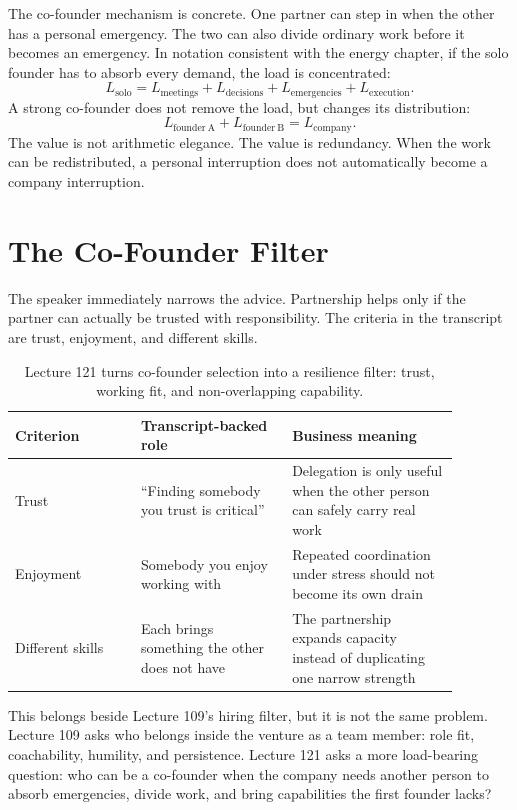 \documentclass[11pt,oneside]{book}
\begin{document}
The co-founder mechanism is concrete. One partner can step in when the other has a personal emergency. The two can also divide ordinary work before it becomes an emergency. In notation consistent with the energy chapter, if the solo founder has to absorb every demand, the load is concentrated:
\[
L_{\mathrm{solo}}
=
L_{\mathrm{meetings}}
+
L_{\mathrm{decisions}}
+
L_{\mathrm{emergencies}}
+
L_{\mathrm{execution}}.
\]
A strong co-founder does not remove the load, but changes its distribution:
\[
L_{\mathrm{founder\ A}}+L_{\mathrm{founder\ B}}
=
L_{\mathrm{company}}.
\]
The value is not arithmetic elegance. The value is redundancy. When the work can be redistributed, a personal interruption does not automatically become a company interruption.

\section{The Co-Founder Filter}

The speaker immediately narrows the advice. Partnership helps only if the partner can actually be trusted with responsibility. The criteria in the transcript are trust, enjoyment, and different skills.

\begin{table}
\centering
\small
\begin{tabular}{p{0.25\linewidth}p{0.30\linewidth}p{0.33\linewidth}}
\hline
Criterion & Transcript-backed role & Business meaning \\
\hline
Trust & ``Finding somebody you trust is critical'' & Delegation is only useful when the other person can safely carry real work \\
Enjoyment & Somebody you enjoy working with & Repeated coordination under stress should not become its own drain \\
Different skills & Each brings something the other does not have & The partnership expands capacity instead of duplicating one narrow strength \\
\hline
\end{tabular}
\caption{Lecture 121 turns co-founder selection into a resilience filter: trust, working fit, and non-overlapping capability.}
\end{table}

This belongs beside Lecture 109's hiring filter, but it is not the same problem. Lecture 109 asks who belongs inside the venture as a team member: role fit, coachability, humility, and persistence. Lecture 121 asks a more load-bearing question: who can be a co-founder when the company needs another person to absorb emergencies, divide work, and bring capabilities the first founder lacks?
\end{document}
